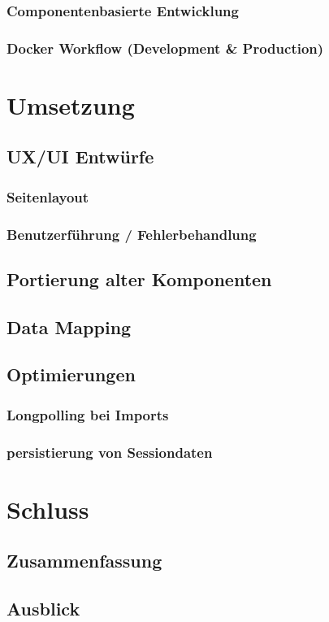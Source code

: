 \documentclass[11pt,a4paper]{article}
\begin{document}
	\subsubsection{Componentenbasierte Entwicklung}
	\subsubsection{Docker Workflow (Development \& Production)}
	
	\section{Umsetzung}
	\subsection{UX/UI Entwürfe}
	\subsubsection{Seitenlayout}
	\subsubsection{Benutzerführung / Fehlerbehandlung}
	\subsection{Portierung alter Komponenten}
	\subsection{Data Mapping}
	\subsection{Optimierungen}
	\subsubsection{Longpolling bei Imports}
	\subsubsection{persistierung von Sessiondaten}
	
	
	\section{Schluss}
	\subsection{Zusammenfassung}
	\subsection{Ausblick}
	
	
	
\end{document}
